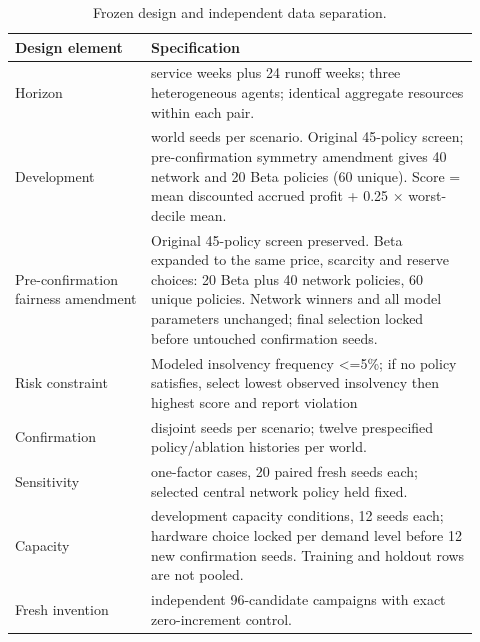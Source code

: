\begin{table}[!htbp]\centering\small
\caption{Frozen design and independent data separation.}
\begin{tabularx}{\linewidth}{>{\raggedright\arraybackslash}p{0.27\linewidth}>{\raggedright\arraybackslash}p{0.65\linewidth}}\toprule
Design element & Specification\\\midrule
Horizon & 104 service weeks plus 24 runoff weeks; three heterogeneous agents; identical aggregate resources within each pair.\\
Development & 24 world seeds per scenario. Original 45-policy screen; pre-confirmation symmetry amendment gives 40 network and 20 Beta policies (60 unique). Score = mean discounted accrued profit + 0.25 × worst-decile mean.\\
Pre-confirmation fairness amendment & Original 45-policy screen preserved. Beta expanded to the same price, scarcity and reserve choices: 20 Beta plus 40 network policies, 60 unique policies. Network winners and all model parameters unchanged; final selection locked before untouched confirmation seeds.\\
Risk constraint & Modeled insolvency frequency <=5\%; if no policy satisfies, select lowest observed insolvency then highest score and report violation\\
Confirmation & 128 disjoint seeds per scenario; twelve prespecified policy/ablation histories per world.\\
Sensitivity & 136 one-factor cases, 20 paired fresh seeds each; selected central network policy held fixed.\\
Capacity & 18 development capacity conditions, 12 seeds each; hardware choice locked per demand level before 12 new confirmation seeds. Training and holdout rows are not pooled.\\
Fresh invention & 256 independent 96-candidate campaigns with exact zero-increment control.\\
\bottomrule
\end{tabularx}
\end{table}

